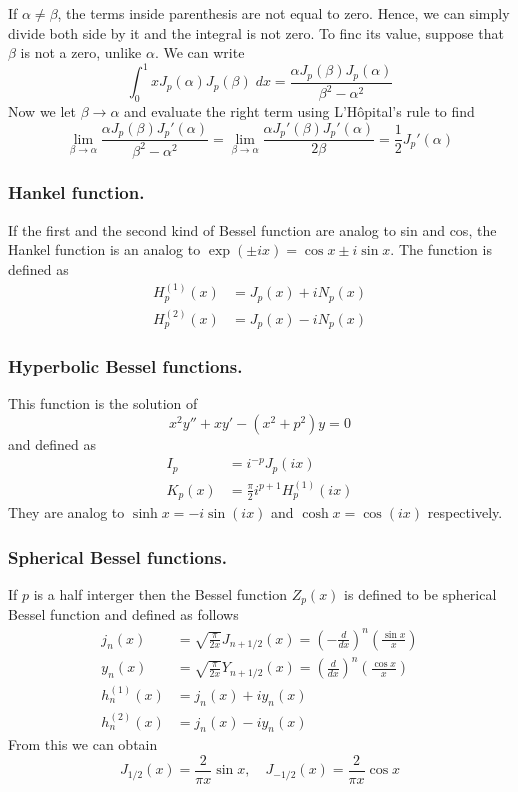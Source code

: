 \documentclass[../main.tex]{subfiles}
\begin{document}
If $\alpha\neq\beta$, the terms inside parenthesis are not equal to zero. Hence, we can simply divide both side by it and the integral is not zero. To finc its value, suppose that $\beta$ is not a zero, unlike $\alpha$. We can write 
\begin{equation*}
    \int_{0}^{1}xJ_p(\alpha)J_p(\beta)\;dx=\frac{\alpha J_p(\beta)J_p(\alpha)}{\beta^2-\alpha^2}
\end{equation*}
Now we let $\beta\rightarrow\alpha$ and evaluate the right term using  L'Hôpital's rule to find 
\begin{equation*}
    \lim_{\beta\rightarrow\alpha}\frac{\alpha J_p(\beta)J_p'(\alpha)}{\beta^2-\alpha^2} =\lim_{\beta\rightarrow\alpha}\frac{\alpha J_p'(\beta)J_p'(\alpha)}{2\beta}=\frac{1}{2}J_p'(\alpha)
\end{equation*}


\subsubsection*{Hankel function.} If the first and the second kind of Bessel function are analog to sin and cos, the Hankel function is an analog to $\exp(\pm ix)=\cos x \pm i\sin x$. The function is defined as  
\begin{align*}
    H_p^{(1)}(x)&=J_p(x)+iN_p(x)\\
    H_p^{(2)}(x)&=J_p(x)-iN_p(x)
\end{align*}

\subsubsection*{Hyperbolic Bessel functions.} This function is the solution of 
\begin{equation*}
    x^2y''+xy'-(x^2+p^2)y=0
\end{equation*}
and defined as 
\begin{align*}
    I_p&=i^{-p}J_p(ix)\\
    K_p(x)&=\frac{\pi}{2}i^{p+1}H_p^{(1)}(ix)
\end{align*}
They are analog to $\sinh x= -i\sin (ix)$ and $\cosh x=\cos (ix)$ respectively.

\subsubsection*{Spherical Bessel functions.} If $p$ is a half interger
then the Bessel function $Z_p(x)$ is defined to be spherical Bessel function and defined as follows
\begin{align*}
    j_n(x)&=\sqrt{\frac{\pi}{2x}}J_{n+1/2}(x)=\left(-\frac{d}{dx}\right)^n\left(\frac{\sin x}{x}\right)\\
    y_n(x)&=\sqrt{\frac{\pi}{2x}}Y_{n+1/2}(x)=\left(\frac{d}{dx}\right)^n\left(\frac{\cos x}{x}\right)\\
    h_n^{(1)}(x)&=j_n(x)+iy_n(x)\\
    h_n^{(2)}(x)&=j_n(x)-iy_n(x)
\end{align*}
From this we can obtain 
\begin{equation*}
    J_{1/2}(x)=\frac{2}{\pi x}\sin x, \quad J_{-1/2}(x)=\frac{2}{\pi x}\cos x
\end{equation*} 
\end{document}
